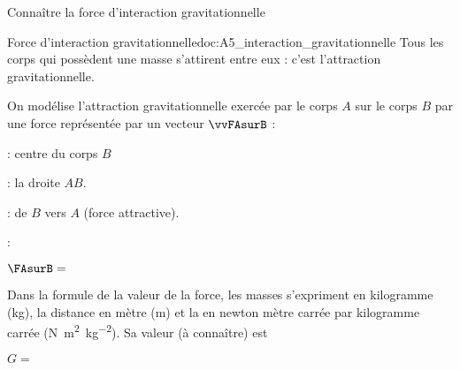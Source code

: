 \teteSndMouv

\nomPrenomClasse
{}

\begin{objectifs}
  \item Connaître la force d'interaction gravitationnelle
\end{objectifs}



\begin{doc}{Force d'interaction gravitationnelle}{doc:A5_interaction_gravitationnelle}
  \chevron Tous les corps qui possèdent une masse s’attirent entre eux : c’est l’attraction gravitationnelle.
  \begin{importants}
    On modélise l'attraction gravitationnelle exercée par le corps $A$ sur le corps $B$ par une force représentée par un vecteur $\vvFAsurB$ :
    
    \vspace*{-12pt}
    \begin{wrapfigure}[6]{r}{0.4\linewidth}
      \vspace*{-10pt}
      
    \end{wrapfigure}
    \phantom{b}
    
    \begin{listePoints}
      \item {} : centre du corps $B$
      \item {} : la droite $AB$.
      \item {} : de $B$ vers $A$ (force attractive).
      \item {} : 
    \end{listePoints}
    \begin{center}
      $\FAsurB =$ 
    \end{center}
      
    Dans la formule de la valeur de la force, les masses s'expriment en kilogramme (\unit{\kg}),
    la distance en mètre (\unit{\m}) et
    la  en newton mètre carrée par kilogramme carrée (\unit{\newton \m\squared \per\kg\squared}).
    Sa valeur (à connaître) est 
    \begin{center}
      $G =$ 
    \end{center}
  \end{importants}
\end{doc}

